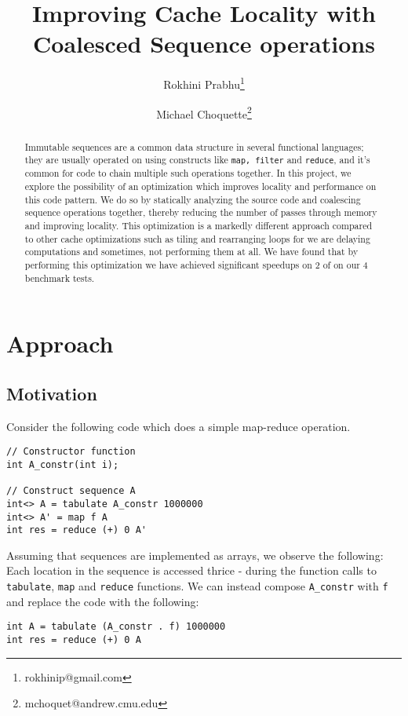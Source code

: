 \documentclass[a4paper,twocolumn]{article}
\title{Improving Cache Locality with Coalesced Sequence operations}
\date{\vspace{-5ex}}
\author{Rokhini Prabhu\thanks{rokhinip@gmail.com} }
\author{Michael Choquette\thanks{mchoquet@andrew.cmu.edu}}
\affil{Carnegie Mellon University}
\newcommand{\sml}[1]{\texttt{#1}}
\begin{document}
\maketitle

\begin{abstract}
Immutable sequences are a common data structure in several functional languages; they
are usually operated on using constructs like \sml{map, filter} and
\sml{reduce}, and it's common for code to chain multiple such operations together. In this
project, we explore the possibility of an optimization which improves locality and
performance on this code pattern. We do so by statically analyzing the source code and
coalescing sequence operations together, thereby reducing the number
of passes through memory and improving locality. This optimization is a
markedly different approach compared to other cache optimizations such as tiling and
rearranging loops for we are delaying computations and sometimes,
not performing them at all. We have found that by performing this
optimization we have achieved significant speedups on 2 of on our 4 benchmark tests.
\end{abstract}

\section{Approach}

\subsection{Motivation}
Consider the following code which does a simple map-reduce operation.

\begin{verbatim}
// Constructor function
int A_constr(int i);

// Construct sequence A
int<> A = tabulate A_constr 1000000
int<> A' = map f A
int res = reduce (+) 0 A'
\end{verbatim}

\noindent
Assuming that sequences are implemented as arrays, we observe the following:
Each location in the sequence is accessed thrice - during the function calls to
\sml{tabulate}, \sml{map} and \sml{reduce} functions. We can instead compose
\sml{A_constr} with \sml{f} and replace the code with the following:
\begin{verbatim}
int A = tabulate (A_constr . f) 1000000
int res = reduce (+) 0 A
\end{verbatim}
\end{document}
